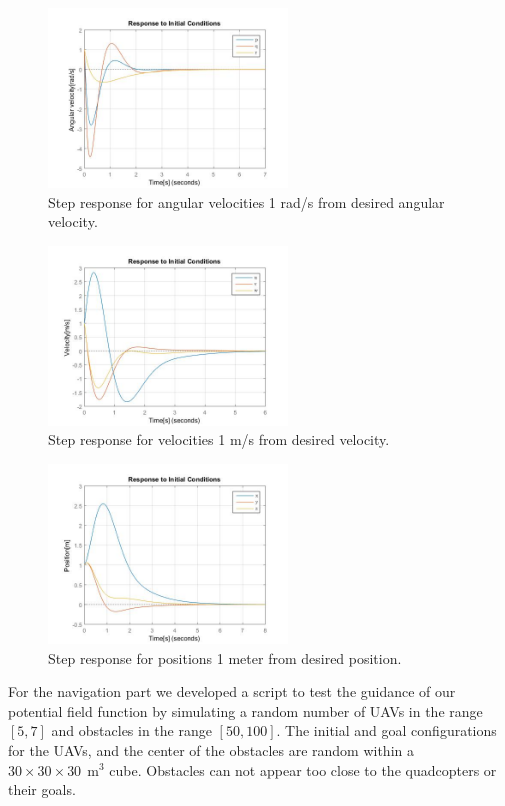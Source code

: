 \documentclass[journal]{IEEEtran}
\begin{document}
		\begin{figure}[H]
  			\centering
  			\includegraphics[width=2.5in]{Results/Controll/Fig2}
  			\caption{Step response for angular velocities 1 rad/s from desired angular velocity.}
  			\label{fig:contresangvel}
		\end{figure}	

		\begin{figure}[H]
  			\centering
  			\includegraphics[width=2.5in]{Results/Controll/Fig3}
  			\caption{Step response for velocities 1 m/s from desired velocity.}
  			\label{fig:contresvel}
		\end{figure}	
		
		\begin{figure}[H]
  			\centering
  			\includegraphics[width=2.5in]{Results/Controll/Fig4}
  			\caption{Step response for positions 1 meter from desired position.}
  			\label{fig:contrespos}
		\end{figure}	

	
	For the navigation part we developed a script to test the guidance of our potential field function by simulating a random number of UAVs in the range $[5,7]$ and obstacles in the range $[50,100]$. The initial and goal configurations for the UAVs, and the center of the obstacles are random within a $30\times 30\times 30   \ \SI{}{\meter^3}$ cube. Obstacles can not appear too close to the quadcopters or their goals.\\
	
\end{document}
